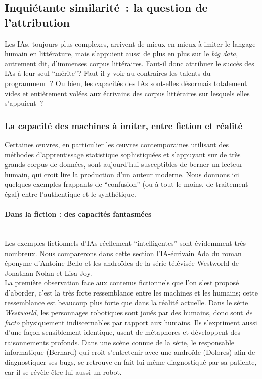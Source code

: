 \documentclass{article}
\newcommand{\subsubsubsection}[1]{\paragraph{#1}\mbox{}\\}
\begin{document}
		\subsection{Inquiétante similarité~: la question de l'attribution}
			Les IAs, toujours plus complexes, arrivent de mieux en mieux à imiter le langage humain en littérature, mais s'appuient aussi de plus en plus sur le \textit{big data}, autrement dit, d'immenses corpus littéraires. Faut-il donc attribuer le succès des IAs à leur seul ``mérite''? Faut-il y voir au contraires les talents du programmeur~? Ou bien, les capacités des IAs sont-elles désormais totalement vides et entièrement volées aux écrivains des corpus littéraires sur lesquels elles s'appuient~?
			\subsubsection{La capacité des machines à imiter, entre fiction et réalité}\label{fiction_vs_realite}
				Certaines œuvres, en particulier les œuvres contemporaines utilisant des méthodes d'apprentissage statistique sophistiquées et s'appuyant sur de très grands corpus de données, sont aujourd'hui susceptibles de berner un lecteur humain, qui croit lire la production d'un auteur moderne. Nous donnons ici quelques exemples frappants de ``confusion'' (ou à tout le moins, de traitement égal) entre l'authentique et le synthétique.
				\subsubsubsection{Dans la fiction : des capacités fantasmées}
					Les exemples fictionnels d'IAs réellement ``intelligentes'' sont évidemment très nombreux. Nous comparerons dans cette section l'IA-écrivain Ada du roman éponyme d'Antoine Bello \cite{bello2016} et les androïdes de la série télévisée Westworld de Jonathan Nolan et Lisa Joy.\\
					
					La première observation face aux contenus fictionnels que l'on s'est proposé d'aborder, c'est la très forte ressemblance entre les machines et les humains; cette ressemblance est beaucoup plus forte que dans la réalité actuelle. Dans le série \textit{Westworld}, les personnages robotiques sont joués par des humains, donc sont \textit{de facto} physiquement indiscernables par rapport aux humains. Ils s'expriment aussi d'une façon sensiblement identique, usent de métaphores et développent des raisonnements profonds. Dans une scène connue de la série, le responsable informatique (Bernard) qui croit s'entretenir avec une androïde (Dolores) afin de diagnostiquer ses bugs, se retrouve en fait lui-même diagnostiqué par sa patiente, car il se révèle être lui aussi un robot.\\
					
\end{document}
